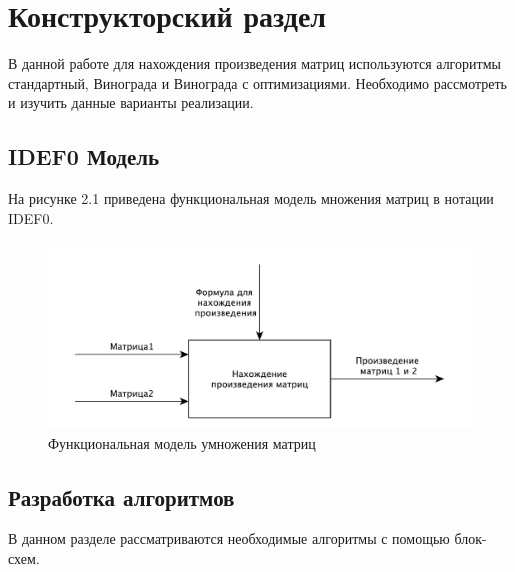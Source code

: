 \graphicspath{{pict/}}

\chapter{Конструкторский раздел}
\label{cha:design}

В данной работе для нахождения произведения матриц используются алгоритмы стандартный, Винограда и Винограда с оптимизациями. Необходимо рассмотреть и изучить данные варианты реализации.

\section{IDEF0 Модель}

На рисунке 2.1 приведена функциональная модель множения матриц в нотации IDEF0.
\begin{figure}
\centering
\includegraphics[scale=0.75]{idef0.pdf}
\caption{Функциональная модель умножения матриц}
\end{figure}
\newpage

\section{Разработка алгоритмов}
В данном разделе рассматриваются необходимые алгоритмы с помощью блок-схем.
